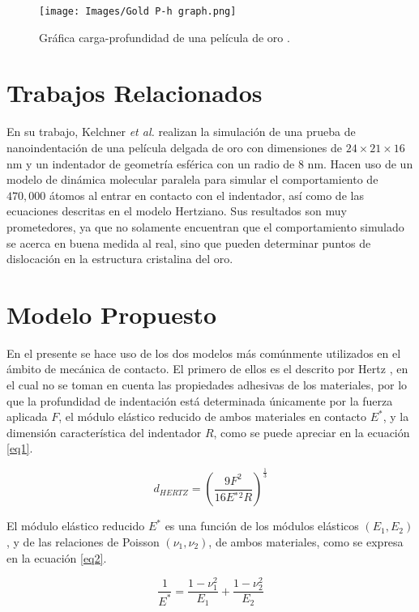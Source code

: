 \documentclass[final,6p,times,twocolumn]{elsarticle}
\begin{document}
\begin{figure}
    \centering
    \texttt{[image: Images/Gold P-h graph.png]}
    \caption{Gr\'afica carga-profundidad de una pel\'icula de oro \cite{BEAKE2002}.}
    \label{fig1}
\end{figure}

\section{Trabajos Relacionados}
En su trabajo, Kelchner \textit{et al.} \cite{KELCHNER1998} realizan la simulaci\'on de una prueba de nanoindentaci\'on de una pel\'icula delgada de oro con dimensiones de $24\times21\times16$ nm y un indentador de geometr\'ia esf\'erica con un radio de $8$ nm. Hacen uso de un modelo de din\'amica molecular paralela para simular el comportamiento de $470,000$ \'atomos al entrar en contacto con el indentador, as\'i como de las ecuaciones descritas en el modelo Hertziano. Sus resultados son muy prometedores, ya que no solamente encuentran que el comportamiento simulado se acerca en buena medida al real, sino que pueden determinar puntos de dislocaci\'on en la estructura cristalina del oro.

\section{Modelo Propuesto}\label{mod}
En el presente se hace uso de los dos modelos m\'as com\'unmente utilizados en el \'ambito de mec\'anica de contacto. El primero de ellos es el descrito por Hertz \cite{HERTZ}, en el cual no se toman en cuenta las propiedades adhesivas de los materiales, por lo que la profundidad de indentaci\'on est\'a determinada \'unicamente por la fuerza aplicada $F$, el m\'odulo el\'astico reducido de ambos materiales en contacto $E^*$, y la dimensi\'on caracter\'istica del indentador $R$, como se puede apreciar en la ecuaci\'on \ref{eq1}.

\begin{equation}\label{eq1}
    d_{HERTZ} = \left( \frac{9F^2}{16E{^*}{^2}R} \right)^\frac{1}{3}
\end{equation}

El m\'odulo el\'astico reducido $E^*$ es una funci\'on de los m\'odulos el\'asticos $(E_1, E_2)$, y de las relaciones de Poisson $(\nu_1, \nu_2)$, de ambos materiales, como se expresa en la ecuaci\'on \ref{eq2}.

\begin{equation}\label{eq2}
    \frac{1}{E^*}=\frac{1-\nu_1^2}{E_1} + \frac{1-\nu_2^2}{E_2}
\end{equation}
\end{document}
